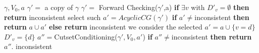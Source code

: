 \documentclass[10pt, letterpaper]{report}
\begin{document}
\begin{algorithm}
    \caption{CutsetConditioning}\label{alg:CutsetConditioning}
    \begin{algorithmic}
    \Require $\gamma,V_0,a$
    \State $\gamma'=$ a copy of $\gamma$
    \State $\gamma'=$ Forward Checking($\gamma'$,a)
    \State\textbf{if} $\exists v$ with $D'_v=\emptyset$ \textbf{then return} inconsistent 
    \State select such  
    \Else  
    \State $a'=AcyclicCG(\gamma')$
    \State\textbf{if} $a'\ne$inconsistent \textbf{then return} $a\cup a'$ 
    \State\textbf{else return} inconsistent 
    \EndIf 
    \State we consider the selected 
    \State $a'=a\cup\{v=d\}$
    \State $D'_v=\{d\}$
    \State $a''=$CutsetConditioning($\gamma',V_0,a'$)
    \State\textbf{if} $a''\ne$inconsistent \textbf{then return} $a''$.  
    \EndFor 
    \State\Return inconsistent 
    \end{algorithmic}
\end{algorithm}
\end{document}
